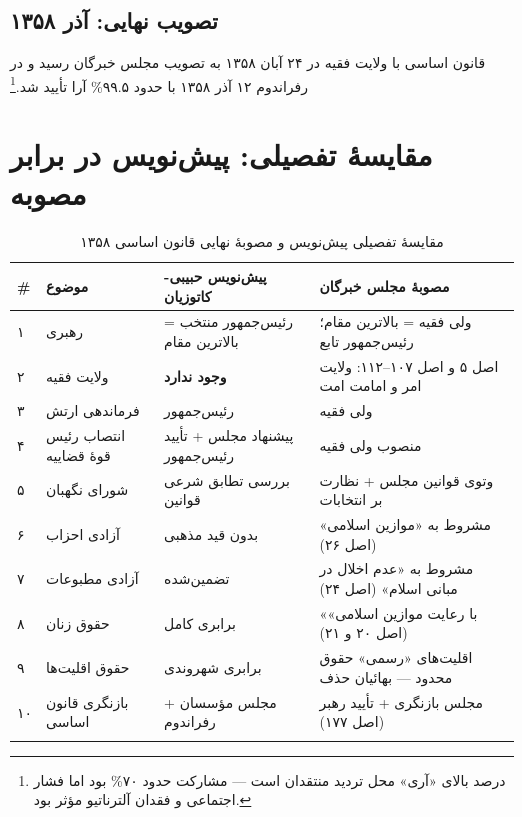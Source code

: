 \documentclass[12pt,a4paper]{book}
\newcommand{\keyword}[1]{\textbf{\textcolor{cPrimary}{#1}}}
\newcommand{\en}[1]{\lr{\textit{#1}}}
\begin{document}
\subsection{تصویب نهایی: آذر ۱۳۵۸}

قانون اساسی با ولایت فقیه در ۲۴ آبان ۱۳۵۸ به تصویب مجلس خبرگان رسید و در رفراندوم ۱۲ آذر ۱۳۵۸ با حدود ۹۹.۵\% آرا تأیید شد.\footnote{\en{Schirazi (1997), pp.\,36--40.} درصد بالای «آری» محل تردید منتقدان است — مشارکت حدود ۷۰\% بود اما فشار اجتماعی و فقدان آلترناتیو مؤثر بود.}

\section{مقایسهٔ تفصیلی: پیش‌نویس در برابر مصوبه}

\begin{longtable}{%
    >{\centering\arraybackslash}p{}
    >{\raggedleft\arraybackslash}p{}
    >{\raggedleft\arraybackslash}p{}
    >{\raggedleft\arraybackslash}p{}}
\toprule
\rowcolor{cPrimary!10}
\textbf{\#} & \textbf{موضوع} & \textbf{پیش‌نویس حبیبی-کاتوزیان} & \textbf{مصوبهٔ مجلس خبرگان} \\
\midrule
\endhead

۱ &
رهبری &
رئیس‌جمهور منتخب = بالاترین مقام &
ولی فقیه = بالاترین مقام؛ رئیس‌جمهور تابع \\
\midrule

۲ &
ولایت فقیه &
\keyword{وجود ندارد} &
اصل ۵ و اصل ۱۰۷–۱۱۲: ولایت امر و امامت امت \\
\midrule

۳ &
فرماندهی ارتش &
رئیس‌جمهور &
ولی فقیه \\
\midrule

۴ &
انتصاب رئیس قوهٔ قضاییه &
پیشنهاد مجلس + تأیید رئیس‌جمهور &
منصوب ولی فقیه \\
\midrule

۵ &
شورای نگهبان &
بررسی تطابق شرعی قوانین &
وتوی قوانین مجلس + نظارت بر انتخابات \\
\midrule

۶ &
آزادی احزاب &
بدون قید مذهبی &
مشروط به «موازین اسلامی» (اصل ۲۶) \\
\midrule

۷ &
آزادی مطبوعات &
تضمین‌شده &
مشروط به «عدم اخلال در مبانی اسلام» (اصل ۲۴) \\
\midrule

۸ &
حقوق زنان &
برابری کامل &
«با رعایت موازین اسلامی» (اصل ۲۰ و ۲۱) \\
\midrule

۹ &
حقوق اقلیت‌ها &
برابری شهروندی &
اقلیت‌های «رسمی» حقوق محدود — بهائیان حذف \\
\midrule

۱۰ &
بازنگری قانون اساسی &
مجلس مؤسسان + رفراندوم &
مجلس بازنگری + تأیید رهبر (اصل ۱۷۷) \\

\bottomrule
\caption{مقایسهٔ تفصیلی پیش‌نویس و مصوبهٔ نهایی قانون اساسی ۱۳۵۸}
\label{tab:constitution-detailed}
\end{longtable}
\end{document}
